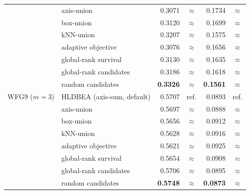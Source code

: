 \begin{table}[!htbp]
\begin{tabular}{|l|l|r|c|r|c|}
 & axis-union & 0.3071 & $\approx$ & 0.1734 & $\approx$ \\
 & box-union & 0.3120 & $\approx$ & 0.1699 & $\approx$ \\
 & kNN-union & 0.3207 & $\approx$ & 0.1575 & $\approx$ \\
 & adaptive objective & 0.3076 & $\approx$ & 0.1656 & $\approx$ \\
 & global-rank survival & 0.3130 & $\approx$ & 0.1635 & $\approx$ \\
 & global-rank candidates & 0.3186 & $\approx$ & 0.1618 & $\approx$ \\
 & random candidates & \textbf{0.3326} & $\approx$ & \textbf{0.1561} & $\approx$ \\
\hline
WFG9 ($m=3$) & HLDBEA (axis-sum, default) & 0.5707 & ref. & 0.0893 & ref. \\
 & axis-union & 0.5697 & $\approx$ & 0.0888 & $\approx$ \\
 & box-union & 0.5656 & $\approx$ & 0.0912 & $\approx$ \\
 & kNN-union & 0.5628 & $\approx$ & 0.0916 & $\approx$ \\
 & adaptive objective & 0.5621 & $\approx$ & 0.0925 & $\approx$ \\
 & global-rank survival & 0.5654 & $\approx$ & 0.0908 & $\approx$ \\
 & global-rank candidates & 0.5706 & $\approx$ & 0.0895 & $\approx$ \\
 & random candidates & \textbf{0.5748} & $\approx$ & \textbf{0.0873} & $\approx$ \\
\hline
\end{tabular}
\end{table}
